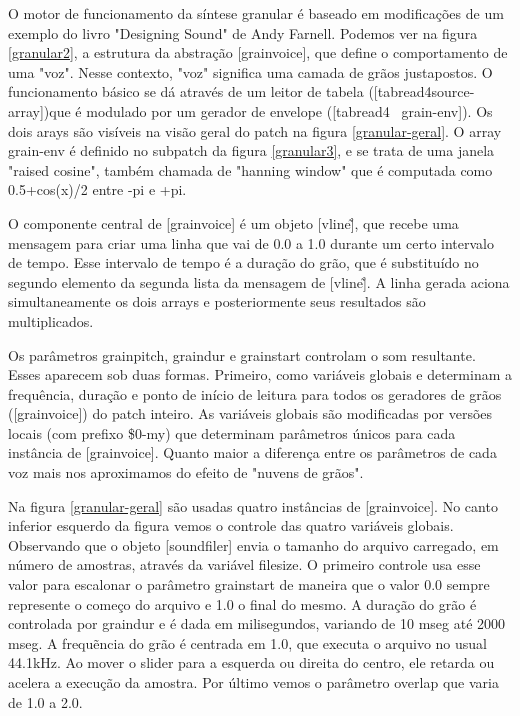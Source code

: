 \documentclass[draft]{ppgmus}
\begin{document}
O motor de funcionamento da síntese granular é baseado em modificações de um exemplo
do livro "Designing Sound" de Andy Farnell. Podemos ver na figura \ref{granular2}, a estrutura
da abstração [grainvoice], que define o comportamento de uma "voz". Nesse contexto,
"voz" significa uma camada de grãos justapostos. O funcionamento básico se dá através
de um leitor de tabela ([tabread4\texttildelow source-array])que é modulado por um gerador de envelope ([tabread4~ grain-env]).
Os dois arays são visíveis na visão geral do patch na figura \ref{granular-geral}. O array grain-env
é definido no subpatch da figura \ref{granular3}, e se trata de uma janela "raised cosine", também
chamada de "hanning window" que é computada como 0.5+cos(x)/2 entre -pi e +pi.

O componente central de [grainvoice] é um objeto [vline\~], que recebe uma mensagem para criar uma linha que 
vai de 0.0 a 1.0 durante um certo intervalo de tempo. Esse intervalo de tempo é a duração
do grão, que é substituído no segundo elemento da segunda lista da mensagem de [vline\~].
A linha gerada aciona simultaneamente os dois arrays e posteriormente 
seus resultados são multiplicados.

Os parâmetros grainpitch, graindur e grainstart controlam o som resultante. Esses aparecem sob duas
formas. Primeiro, como variáveis globais e determinam a frequência, duração e ponto de início de leitura para
todos os geradores de grãos ([grainvoice]) do patch inteiro. As variáveis globais são modificadas
por versões locais (com prefixo \$0-my) que determinam parâmetros únicos para cada instância de [grainvoice].
Quanto maior a diferença entre os parâmetros de cada voz mais nos aproximamos do efeito de "nuvens de grãos".

Na figura \ref{granular-geral} são usadas quatro instâncias de [grainvoice]. No canto inferior esquerdo da figura
vemos o controle das quatro variáveis globais. Observando que o objeto [soundfiler] envia o tamanho do arquivo
carregado, em número de amostras, através da variável filesize. O primeiro controle usa esse valor para escalonar
o parâmetro grainstart de maneira que o valor 0.0 sempre represente o começo do arquivo e 1.0 o final do mesmo.
A duração do grão é controlada por graindur e é dada em milisegundos, variando de 10 mseg até 2000 mseg.
A frequẽncia do grão é centrada em 1.0, que executa o arquivo no usual 44.1kHz. Ao mover o slider para a esquerda
ou direita do centro, ele retarda ou acelera a execução da amostra. Por último vemos o parâmetro overlap que varia de
1.0 a 2.0.
\end{document}
